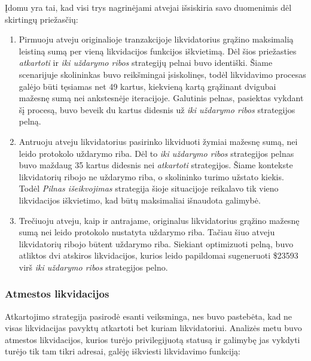 \documentclass{VUMIFPSkursinis}
\begin{document}
Įdomu yra tai, kad visi trys nagrinėjami atvejai išsiskiria savo duomenimis dėl skirtingų priežasčių:

\begin{enumerate}[label=\textbf{\Alph*.}]
  \item Pirmuoju atveju originalioje tranzakcijoje likvidatorius grąžino maksimalią leistiną sumą per vieną likvidacijos funkcijos iškvietimą. Dėl šios priežasties \textit{atkartoti} ir \textit{iki uždarymo ribos} strategijų pelnai buvo identiški. Šiame scenarijuje skolininkas buvo reikšmingai įsiskolinęs, todėl likvidavimo procesas galėjo būti tęsiamas net 49 kartus, kiekvieną kartą grąžinant dvigubai mažesnę sumą nei ankstesnėje iteracijoje. Galutinis pelnas, pasiektas vykdant šį procesą, buvo beveik du kartus didesnis už \textit{iki uždarymo ribos} strategijos pelną.

  \item Antruoju atveju likvidatorius pasirinko likviduoti žymiai mažesnę sumą, nei leido protokolo uždarymo riba. Dėl to \textit{iki uždarymo ribos} strategijos pelnas buvo maždaug 35 kartus didesnis nei \textit{atkartoti} strategijos. Šiame kontekste likvidatorių ribojo ne uždarymo riba, o skolininko turimo užstato kiekis. Todėl \textit{Pilnas išeikvojimas} strategija šioje situacijoje reikalavo tik vieno likvidacijos iškvietimo, kad būtų maksimaliai išnaudota galimybė.

  \item Trečiuoju atveju, kaip ir antrajame, originalus likvidatorius grąžino mažesnę sumą nei leido protokolo nustatyta uždarymo riba. Tačiau šiuo atveju likvidatorių ribojo būtent uždarymo riba. Siekiant optimizuoti pelną, buvo atliktos dvi atskiros likvidacijos, kurios leido papildomai sugeneruoti \$23593 virš \textit{iki uždarymo ribos} strategijos pelno.
\end{enumerate}

\subsubsection{Atmestos likvidacijos}

Atkartojimo strategija pasirodė esanti veiksminga, nes buvo pastebėta, kad ne visas likvidacijas pavyktų atkartoti bet kuriam likvidatoriui. Analizės metu buvo atmestos likvidacijos, kurios turėjo privilegijuotą statusą ir galimybę jas vykdyti turėjo tik tam tikri adresai, galėję iškviesti likvidavimo funkciją:
\end{document}
